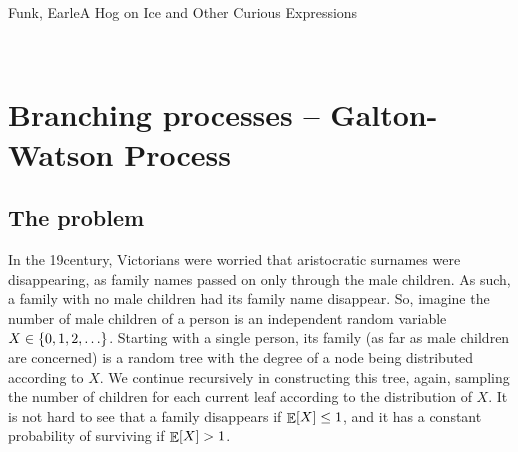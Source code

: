
%



%
{Funk, Earle}{A Hog on Ice and Other Curious Expressions}


\noindent%
\ChapterPrefix{}%
\ChapterGen{}

~


\bigskip%


\section{Branching processes -- Galton-Watson Process}

\subsection{The problem} %

In the 19\th century, Victorians were worried that aristocratic
surnames were disappearing, as family names passed on only through the
male children. As such, a family with no male children had its family
name disappear. So, imagine the number of male children of a person is
an independent random variable $X \in \left\{ {0,1,2,\ldots} \right\}$. Starting
with a single person, its family (as far as male children are
concerned) is a random tree with the degree of a node being
distributed according to $X$. We continue recursively in constructing
this tree, again, sampling the number of children for each current
leaf according to the distribution of $X$.  It is not hard to see that
a family disappears if $\mathop{\mathbb{E}}\!\left[ {X} \right] \leq 1$, and it has a constant
probability of surviving if $\mathop{\mathbb{E}}\!\left[ {X} \right] >1$.


